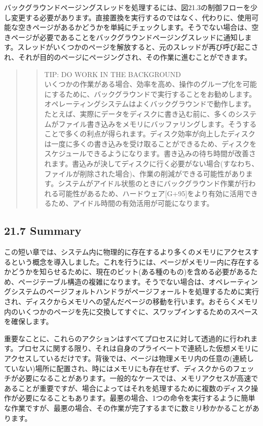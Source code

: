 バックグラウンドページングスレッドを処理するには、図21.3の制御フローを少し変更する必要があります。直接置換を実行するのではなく、代わりに、使用可能な空きページがあるかどうかを単純にチェックします。そうでない場合は、空きページが必要であることをバックグラウンドページングスレッドに通知します。スレッドがいくつかのページを解放すると、元のスレッドが再び呼び起こされ、それが目的のページにページングされ、その作業に進むことができます。

\begin{quote}
\begin{quote}
TIP: DO WORK IN THE BACKGROUND\\
いくつかの作業がある場合、効率を高め、操作のグループ化を可能にするために、バックグラウンドで実行することをお勧めします。オペレーティングシステムはよくバックグラウンドで動作します。たとえば、実際にデータをディスクに書き込む前に、多くのシステムがファイル書き込みをメモリにバッファリングします。そうすることで多くの利点が得られます。ディスク効率が向上したディスクは一度に多くの書き込みを受け取ることができるため、ディスクをスケジュールできるようになります。書き込みの待ち時間が改善されます。書込みが決してディスクに行く必要がない場合(すなわち、ファイルが削除された場合)、作業の削減ができる可能性があります。システムがアイドル状態のときにバックグラウンド作業が行われる可能性があるため、ハードウェア{[}G+95{]}をより有効に活用できるため、アイドル時間の有効活用が可能になります。
\end{quote}
\end{quote}

\hypertarget{summary-13}{%
\subsection*{21.7 Summary}\label{summary-13}}

この短い章では、システム内に物理的に存在するより多くのメモリにアクセスするという概念を導入しました。これを行うには、ページがメモリー内に存在するかどうかを知らせるために、現在のビット(ある種のもの)を含める必要があるため、ページテーブル構造の複雑になります。そうでない場合は、オペレーティングシステムのページフォルトハンドラがページフォールトを処理するために実行され、ディスクからメモリへの望んだページの移動を行います。おそらくメモリ内のいくつかのページを先に交換してすぐに、スワップインするためのスペースを確保します。

重要なことに、これらのアクションはすべてプロセスに対して透過的に行われます。プロセスに関する限り、それは自身のプライベートで連続した仮想メモリにアクセスしているだけです。背後では、ページは物理メモリ内の任意の(連続していない)場所に配置され、時にはメモリにも存在せず、ディスクからのフェッチが必要になることがあります。一般的なケースでは、メモリアクセスが高速であることが重要ですが、場合によってはそれを処理するために複数のディスク操作が必要になることもあります。最悪の場合、1つの命令を実行するように簡単な作業ですが、最悪の場合、その作業が完了するまでに数ミリ秒かかることがあります。

